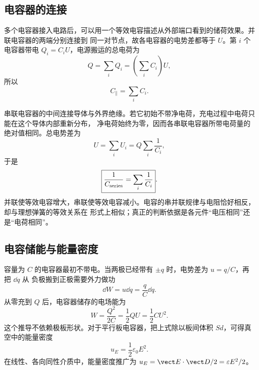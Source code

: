 \capacitorGeometryDiagram

\subsection*{电容器的连接}

多个电容器接入电路后，可以用一个等效电容描述从外部端口看到的储荷效果。并联电容器的两端分别连接到
同一对节点，故各电容器的电势差都等于 $U$。第 $i$ 个电容器带电 $Q_i=C_iU$，电源搬运的总电荷为
\begin{equation}
  Q=\sum_iQ_i=\left(\sum_iC_i\right)U,
\end{equation}
所以
\begin{equation}
  \boxed{C_{\parallel}=\sum_iC_i}.
\end{equation}

串联电容器的中间连接导体与外界绝缘。若它初始不带净电荷，充电过程中电荷只能在这个导体内部重新分布，
净电荷始终为零，因而各串联电容器所带电荷量的绝对值相同。总电势差为
\begin{equation}
  U=\sum_iU_i=Q\sum_i\frac1{C_i},
\end{equation}
于是
\begin{equation}
  \boxed{\frac1{C_{\rm series}}=\sum_i\frac1{C_i}}.
\end{equation}
并联使等效电容增大，串联使等效电容减小。电容的串并联规律与电阻恰好相反，却与理想弹簧的等效关系在
形式上相似；真正的判断依据是各元件“电压相同”还是“电荷相同”。

\seriesParallelDiagram

\subsection*{电容储能与能量密度}

容量为 $C$ 的电容器最初不带电。当两极已经带有 $\pm q$ 时，电势差为 $u=q/C$，再把 $\dd q$ 从
负极搬到正极需要外力做功
\begin{equation}
  \dd W=u\dd q=\frac qC\dd q.
\end{equation}
从零充到 $Q$ 后，电容器储存的电场能为
\begin{equation}
  \boxed{W=\frac{Q^2}{2C}=\frac12QU=\frac12CU^2}.
\end{equation}
这个推导不依赖极板形状。对于平行板电容器，把上式除以板间体积 $Sd$，可得真空中的能量密度
\begin{equation}
  \boxed{u_E=\frac12\varepsilon_0E^2}.
\end{equation}
在线性、各向同性介质中，能量密度推广为 $u_E=\vect E\cdot\vect D/2=\varepsilon E^2/2$。

